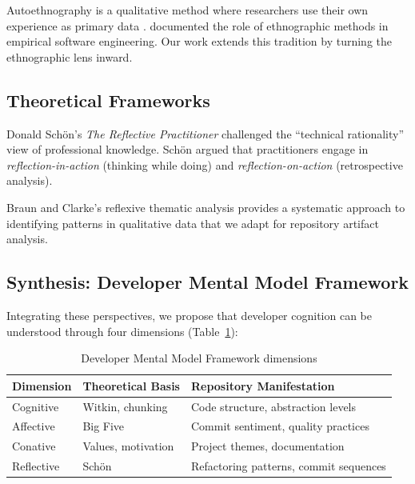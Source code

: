 \documentclass{ntlabs-preprint}
\begin{document}
Autoethnography is a qualitative method where researchers use their own experience as primary data \citep{ellis2000autoethnography}. \citet{sharp2016role} documented the role of ethnographic methods in empirical software engineering. Our work extends this tradition by turning the ethnographic lens inward.

\subsection{Theoretical Frameworks}

Donald Schön's \textit{The Reflective Practitioner} \citep{schon1983reflective} challenged the ``technical rationality'' view of professional knowledge. Schön argued that practitioners engage in \textit{reflection-in-action} (thinking while doing) and \textit{reflection-on-action} (retrospective analysis).

Braun and Clarke's reflexive thematic analysis \citep{braun2006thematic} provides a systematic approach to identifying patterns in qualitative data that we adapt for repository artifact analysis.

\subsection{Synthesis: Developer Mental Model Framework}

Integrating these perspectives, we propose that developer cognition can be understood through four dimensions (Table~\ref{tab:dmmf-dimensions}):

\begin{table}[h]
\centering
\caption{Developer Mental Model Framework dimensions}
\label{tab:dmmf-dimensions}
\begin{tabular}{lll}
\toprule
\textbf{Dimension} & \textbf{Theoretical Basis} & \textbf{Repository Manifestation} \\
\midrule
Cognitive  & Witkin, chunking         & Code structure, abstraction levels \\
Affective  & Big Five                 & Commit sentiment, quality practices \\
Conative   & Values, motivation       & Project themes, documentation \\
Reflective & Schön                    & Refactoring patterns, commit sequences \\
\bottomrule
\end{tabular}
\end{table}
\end{document}
